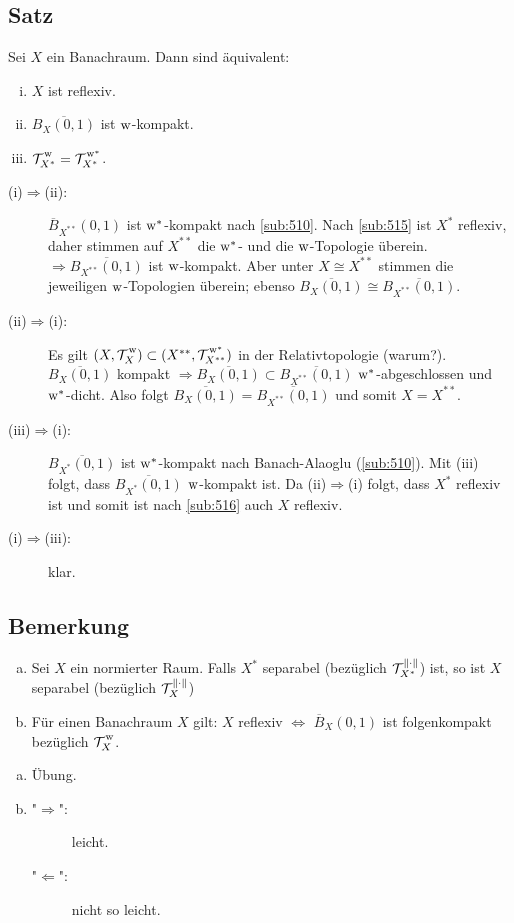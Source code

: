 \subsection{Satz} %
\label{sub:518}
Sei $X$ ein Banachraum. Dann sind äquivalent: 
\begin{enumerate}[(i)]
	\item $X$ ist reflexiv.
	\item $\overline{B_X(0,1)}$ ist $\mathrm{w}$-kompakt.
	\item $\weakT{X^*}= \weakTstar{X^*}$.
\end{enumerate}
\begin{description}
	\item[(i)$\Rightarrow$(ii):] $\overline{B}_{X^{**}}(0,1)$ ist $\mathrm{w}^*$-kompakt nach \ref{sub:510}. Nach \ref{sub:515} ist $X^*$ reflexiv, daher stimmen auf $X^{**}$
	die $\mathrm{w}^*$- und die $\mathrm{w}$-Topologie überein. $\Rightarrow \overline{B_{X^{**}}(0,1)}$ ist $\mathrm{w}$-kompakt. Aber unter $X \cong X^{**}$ stimmen die jeweiligen $\mathrm{w}$-Topologien
	überein; ebenso $\overline{B_{X}(0,1)} \cong \overline{B_{X^{**}}(0,1)}$.
	\item[(ii)$\Rightarrow$(i):] Es gilt $(X,\weakT{X}) \subset (X^{**}, \weakTstar{X^{**}})$ in der Relativtopologie (warum?).
	$\overline{B_X(0,1)}$ kompakt $\Rightarrow \overline{B_X(0,1)} \subset \overline{B_{X^{**}}(0,1)}$ $\mathrm{w}^*$-abgeschlossen und $\mathrm{w}^*$-dicht. Also folgt
	$\overline{B_X(0,1)} = \overline{B_{X^{**}}(0,1)}$ und somit $X=X^{**}$.
	\item[(iii)$\Rightarrow$(i):] $\overline{B_{X^*}(0,1)}$ ist $\mathrm{w}^*$-kompakt nach Banach-Alaoglu (\ref{sub:510}). Mit (iii) folgt, dass $\overline{B_{X^*}(0,1)}$
	$\mathrm{w}$-kompakt ist. Da (ii)$\Rightarrow$(i) folgt, dass $X^*$ reflexiv ist und somit ist nach \ref{sub:516} auch $X$ reflexiv.
	\item[(i)$\Rightarrow$(iii):] klar. \bewende
\end{description}

\subsection{Bemerkung} %
\label{sub:519}
\begin{enumerate}[a)]
	\item Sei $X$ ein normierter Raum. Falls $X^*$ separabel (bezüglich $\mathcal{T}_{X^*}^{\norm{\cdot}}$) ist, so ist $X$ separabel (bezüglich 
	$\mathcal{T}_X^{\norm{\cdot}}$)
	\item Für einen Banachraum $X$ gilt: $X$ reflexiv $\iff$ $\overline{B}_X(0,1)$ ist folgenkompakt bezüglich $\weakT{X}$.
\end{enumerate}
\begin{enumerate}[a)]
	\item Übung.
	\item \begin{description}
		\item["$\Rightarrow$":] leicht.
		\item["$\Leftarrow$":] nicht so leicht. 
	\end{description}
\end{enumerate}
\newpage


